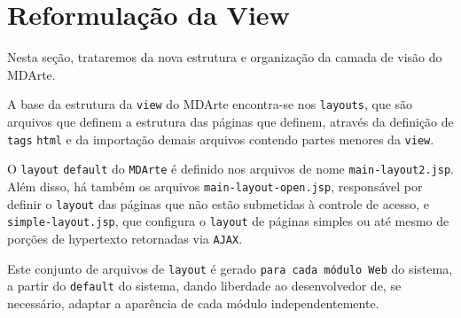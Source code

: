 \section{Reformulação da View}
Nesta seção, trataremos da nova estrutura e organização da camada de visão do
MDArte.

A base da estrutura da \texttt{view} do MDArte encontra-se nos \texttt{layouts},
que são arquivos que definem a estrutura das páginas que definem, através da
definição de \texttt{tags} \texttt{html} e da importação demais arquivos
contendo partes menores da \texttt{view}.

O \texttt{layout} \texttt{default} do \texttt{MDArte} é definido nos arquivos de
nome \texttt{main-layout2.jsp}. Além disso, há também os arquivos
\texttt{main-layout-open.jsp}, responsável por definir o \texttt{layout} das
páginas que não estão submetidas à controle de acesso, e
\texttt{simple-layout.jsp}, que configura o \texttt{layout} de páginas simples
ou até mesmo de porções de hypertexto retornadas via \texttt{AJAX}.

Este conjunto de arquivos de \texttt{layout} é gerado \texttt{para cada módulo
Web} do sistema, a partir do \texttt{default} do sistema, dando liberdade ao
desenvolvedor de, se necessário, adaptar a aparência de cada módulo
independentemente.
